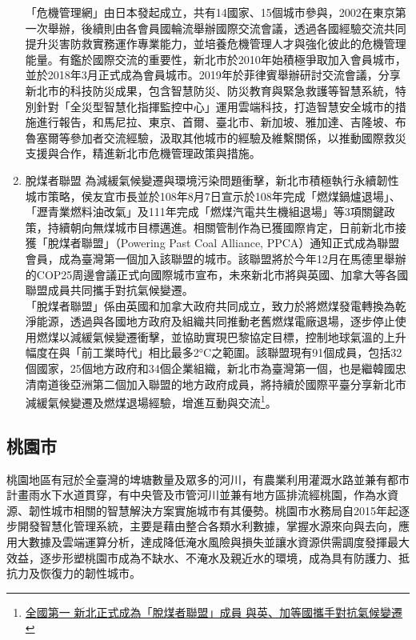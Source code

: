 \documentclass[a4paper,12pt]{article}
\begin{document}
\begin{enumerate}
「危機管理網」由日本發起成立，共有14國家、15個城市參與，2002在東京第一次舉辦，後續則由各會員國輪流舉辦國際交流會議，透過各國經驗交流共同提升災害防救實務運作專業能力，並培養危機管理人才與強化彼此的危機管理能量。有鑑於國際交流的重要性，新北市於2010年始積極爭取加入會員城市，並於2018年3月正式成為會員城市。2019年於菲律賓舉辦研討交流會議，分享新北市的科技防災成果，包含智慧防災、防災教育與緊急救護等智慧系統，特別針對「全災型智慧化指揮監控中心」運用雲端科技，打造智慧安全城市的措施進行報告，和馬尼拉、東京、首爾、臺北市、新加坡、雅加達、吉隆坡、布魯塞爾等參加者交流經驗，汲取其他城市的經驗及維繫關係，以推動國際救災支援與合作，精進新北市危機管理政策與措施。\\
\item 脫煤者聯盟
\label{sec:orgaf59163}
為減緩氣候變遷與環境污染問題衝擊，新北市積極執行永續韌性城市策略，侯友宜市長並於108年8月7日宣示於108年完成「燃煤鍋爐退場」、「瀝青業燃料油改氣」及111年完成「燃煤汽電共生機組退場」等3項關鍵政策，持續朝向無煤城市目標邁進。相關管制作為已獲國際肯定，日前新北市接獲「脫煤者聯盟」（Powering Past Coal Alliance, PPCA）通知正式成為聯盟會員，成為臺灣第一個加入該聯盟的城市。該聯盟將於今年12月在馬德里舉辦的COP25周邊會議正式向國際城市宣布，未來新北市將與英國、加拿大等各國聯盟成員共同攜手對抗氣候變遷。\\

「脫煤者聯盟」係由英國和加拿大政府共同成立，致力於將燃煤發電轉換為乾淨能源，透過與各國地方政府及組織共同推動老舊燃煤電廠退場，逐步停止使用燃煤以減緩氣候變遷衝擊，並協助實現巴黎協定目標，控制地球氣溫的上升幅度在與「前工業時代」相比最多2°C之範圍。該聯盟現有91個成員，包括32個國家，25個地方政府和34個企業組織，新北市為臺灣第一個，也是繼韓國忠清南道後亞洲第二個加入聯盟的地方政府成員，將持續於國際平臺分享新北市減緩氣候變遷及燃煤退場經驗，增進互動與交流\footnote{\href{https://www.epd.ntpc.gov.tw/Article/Info?ID=6011}{全國第一 新北正式成為「脫煤者聯盟」成員 與英、加等國攜手對抗氣候變遷}\\}。\\
\end{enumerate}

\subsection{桃園市}
\label{sec:org70de0f3}
桃園地區有冠於全臺灣的埤塘數量及眾多的河川，有農業利用灌溉水路並兼有都市計畫雨水下水道貫穿，有中央管及市管河川並兼有地方區排流經桃園，作為水資源、韌性城市相關的智慧解決方案實施城市有其優勢。桃園市水務局自2015年起逐步開發智慧化管理系統，主要是藉由整合各類水利數據，掌握水源來向與去向，應用大數據及雲端運算分析，達成降低淹水風險與損失並讓水資源供需調度發揮最大效益，逐步形塑桃園市成為不缺水、不淹水及親近水的環境，成為具有防護力、抵抗力及恢復力的韌性城市。\\
\end{document}
